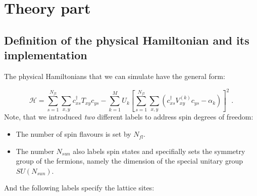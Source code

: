 \section{Theory part}


\subsection{Definition of the physical Hamiltonian and its implementation}

The physical Hamiltonians that we can simulate have the general form:

\begin{equation}
\label{eqn_general_ham2}
\mathcal{H}
=\sum\limits_{s=1}^{N_{fl}}\sum\limits_{x,y}
c^{\dagger}_{xs}T_{xy}c^{\phantom\dagger}_{ys}
-\sum\limits_{k=1}^{M}U_{k}\left[
\sum\limits_{s=1}^{N_{fl}}\sum\limits_{x,y}
\left( 
c^{\dagger}_{xs}V^{(k)}_{xy}c^{\phantom\dagger}_{y s}-\alpha_{k}
\right)
\right]^{2}\;.
\end{equation}
Note, that  we introduced \textit{two} different labels to address spin degrees of freedom:
\begin{itemize}
\item The number of spin flavours is set by $N_{fl}$. 
\item The number $N_{sun}$ also labels spin states and specifially sets the symmetry group of the fermions, namely 
the dimension of the special unitary group $SU(N_{sun})$.
\end{itemize}
And the following labels specify the lattice sites:
